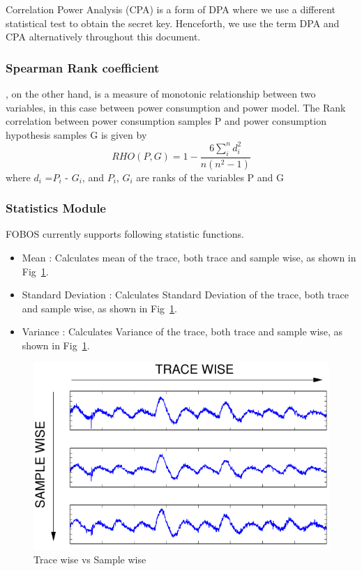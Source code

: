 \documentclass{llncs}
\numberwithin{algorithm}{chapter}
\begin{document}
Correlation Power Analysis (CPA) is a form of DPA where we use a different statistical test to obtain the secret key. Henceforth, we use
the term DPA and CPA alternatively throughout this document.

\subsubsection{Spearman Rank coefficient}, on the other hand, is a measure of monotonic relationship 
between two variables, in this case between power consumption and power model.
The Rank correlation between power consumption samples P and power consumption hypothesis samples G is given by
\begin{equation}
\label{pceqn}
RHO(P,G)=1-\frac{6\sum_{i}^{n}d_i^2}{n(n^2-1)}
\end{equation} 
where $d_i$ =$P_i$ - $G_i$, and $P_i$, $G_i$ are ranks of the variables P and G 

\subsubsection{Statistics Module}
FOBOS currently supports following statistic functions.
\begin{itemize}
\item Mean : Calculates mean of the trace, both trace and sample wise, as shown in Fig~\ref{fig:tvs}.
\item Standard Deviation : Calculates Standard Deviation of the trace, both trace and sample wise, as shown in Fig~\ref{fig:tvs}.
\item Variance : Calculates Variance of the trace, both trace and sample wise, as shown in Fig~\ref{fig:tvs}.
\end{itemize}

\begin{figure}[ht]
\begin{center}
\includegraphics[scale=0.6]{figures/sampleVstrace}
\caption{\label{fig:tvs}Trace wise vs Sample wise}
\end{center} 
\vspace{-3ex}
\end{figure}
\end{document}
